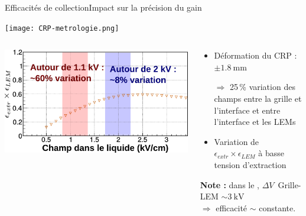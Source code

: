     \begin{frame}{Efficacités de collection}{Impact sur la précision du gain}
        \begin{center} \vspace{-0.5cm}\texttt{[image: CRP-metrologie.png]} \end{center}
        \begin{scriptsize}
            \begin{columns}
                \begin{column}{0.6\textwidth}
                    \centering \includegraphics[width=\textwidth]{./pictures/extr_eff.pdf}
                \end{column}\hfill
                \begin{column}{0.4\textwidth}
                    \begin{itemize}
          					\item Déformation du CRP : $\pm\SI{1.8}{\milli\meter}$
          					\item[$\Rightarrow$]  25\,\% variation des champs entre la grille et l'interface et entre l'interface et les LEMs
          					\item Variation de $\epsilon_{extr}\times\epsilon_{LEM}$ à basse tension d'extraction
          				\end{itemize}
                     \textbf{Note : } dans le \SSS{},  $\Delta V$~Grille-LEM $\sim\SI{3}{\kilo\volt}$\\
                     $\Rightarrow$ efficacité $\sim$ constante.
                \end{column}
            \end{columns}
        \end{scriptsize}
    \end{frame}

